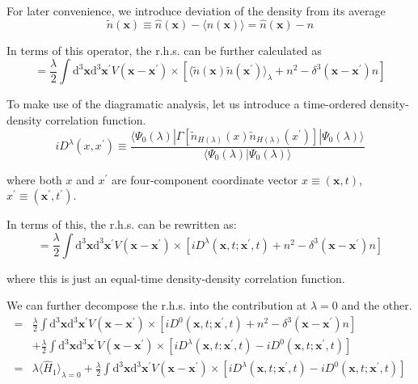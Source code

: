 For later convenience, we introduce deviation of the density from its average
\[ \tilde{n}(\mathbf{x})\equiv \hat{n}(\mathbf{x}) - \langle \hat{n}(\mathbf{x}) \rangle = \hat{n}(\mathbf{x})-n \]

In terms of this operator, the r.h.s. can be further calculated as
\[= \frac{\lambda}{2}\int \mathrm{d}^3\mathbf{x}\mathrm{d}^3\mathbf{x}^{'}
V(\mathbf{x}-\mathbf{x}^{'})\times \left[ \langle \tilde{n}(\mathbf{x})\tilde{n}(\mathbf{x}^{'}) \rangle_{\lambda} + n^2-\delta^3(\mathbf{x}-\mathbf{x}^{'}) n \right]
\]

To make use of the diagramatic analysis, let us introduce a time-ordered density-density correlation function.
\begin{equation} \label{Eqs2.8.2}
i D^\lambda(x,x^{'}) \equiv \frac{\langle \Psi_0(\lambda)|\Gamma[\tilde{n}_{H(\lambda)}(x)\tilde{n}_{H(\lambda)}(x^{'})]|\Psi_0(\lambda) \rangle}{\langle \Psi_0(\lambda)|\Psi_0(\lambda) \rangle}
\end{equation}

where both $x$ and $x^{'}$ are four-component coordinate vector $x\equiv(\mathbf{x},t)$, $x^{'}\equiv(\mathbf{x}^{'},t^{'})$.

In terms of this, the r.h.s. can be rewritten as:
\[= \frac{\lambda}{2}\int \mathrm{d}^3\mathbf{x}\mathrm{d}^3\mathbf{x}^{'}
V(\mathbf{x}-\mathbf{x}^{'})\times \left[ i D^\lambda(\mathbf{x},t;\mathbf{x}^{'},t) + n^2-\delta^3(\mathbf{x}-\mathbf{x}^{'}) n \right]
\]

where this is just an equal-time density-density correlation function.

We can further decompose the r.h.s. into the contribution at $\lambda=0$ and the other.
\[ \begin{split}=& \frac{\lambda}{2}\int \mathrm{d}^3\mathbf{x}\mathrm{d}^3\mathbf{x}^{'}
V(\mathbf{x}-\mathbf{x}^{'})\times \left[ i D^0(\mathbf{x},t;\mathbf{x}^{'},t) + n^2-\delta^3(\mathbf{x}-\mathbf{x}^{'}) n \right]\\
&+\frac{\lambda}{2}\int \mathrm{d}^3\mathbf{x}\mathrm{d}^3\mathbf{x}^{'}
V(\mathbf{x}-\mathbf{x}^{'})\times \left[ i D^\lambda(\mathbf{x},t;\mathbf{x}^{'},t) -  i D^0(\mathbf{x},t;\mathbf{x}^{'},t) \right]\\
=& \lambda \langle \hat{H}_1 \rangle_{\lambda=0} + \frac{\lambda}{2}\int \mathrm{d}^3\mathbf{x}\mathrm{d}^3\mathbf{x}^{'}
V(\mathbf{x}-\mathbf{x}^{'})\times \left[ i D^\lambda(\mathbf{x},t;\mathbf{x}^{'},t) -  i D^0(\mathbf{x},t;\mathbf{x}^{'},t) \right]
\end{split}\]

